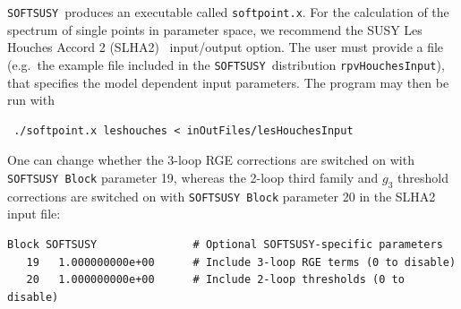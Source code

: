 \documentclass[final,3p,times,pdflatex]{elsarticle}
\def\SOFTSUSY{{\tt SOFTSUSY}}
\def\code#1{\small{\tt #1}\normalsize}
\begin{document}
\SOFTSUSY~produces an executable called \code{softpoint.x}. For the calculation
of the spectrum of single points in parameter space, we recommend the
SUSY Les Houches Accord 2 (SLHA2)~\cite{Allanach:2008qq}  input/output
option. The user must provide a file (e.g.\ the example file included
in the \SOFTSUSY~distribution
\code{rpvHouchesInput}), that specifies the model dependent input
parameters. The program may then be run with
\small
\begin{verbatim}
 ./softpoint.x leshouches < inOutFiles/lesHouchesInput
\end{verbatim}
\normalsize

One can change whether the 3-loop RGE corrections are switched on with
\code{SOFTSUSY Block} parameter 19, whereas the 2-loop third family and $g_3$
threshold corrections 
are switched on with \code{SOFTSUSY Block} parameter 20 in the SLHA2 input file:
\small
\begin{verbatim}
Block SOFTSUSY               # Optional SOFTSUSY-specific parameters
   19   1.000000000e+00      # Include 3-loop RGE terms (0 to disable)
   20   1.000000000e+00      # Include 2-loop thresholds (0 to disable)
\end{verbatim}
\normalsize



\end{document}
